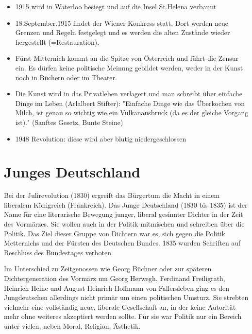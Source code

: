 \documentclass[12pt,a4paper]{article}
\begin{document}
	\begin{itemize}
	\item 1915 wird in Waterloo besiegt und auf die Insel St.Helena verbannt
	\item 18.September.1915 findet der Wiener Konkress statt. Dort werden neue Grenzen und Regeln festgelegt und es werden die alten Zustände
	wieder hergestellt (=Restauration).
	\item Fürst Mitternich kommt an die Spitze von Österreich und führt die Zensur ein. Es dürfen keine politische Meinung gebildet werden, weder in der
	Kunst noch in Büchern oder im Theater.
	\item Die Kunst wird in das Privatleben verlagert und man schreibt über einfache Dinge im Leben (Arlalbert Stifter): "Einfache Dinge wie das Überkochen 
	von Milch, ist genau so wichtig wie ein Vulkanausbruck (da es der gleiche Vorgang ist)." (Sanftes Gesetz, Bunte Steine)

	\item 1948 Revolution: diese wird aber blutig niedergeschlossen	
	
	\end{itemize}
	
\newpage	
	
\section{Junges Deutschland}

Bei der Julirevolution (1830) ergreift das Bürgertum die Macht in einem liberalem Königreich (Frankreich).
Das Junge Deutschland (1830 bis 1835) ist der Name für eine literarische Bewegung junger, liberal gesinnter Dichter in der Zeit des Vormärzes. Sie wollen auch in der Politik mitmischen und schreiben über die Politik. Das Ziel dieser Gruppe von Dichtern war es, sich gegen die Politik Metternichs und der Fürsten des Deutschen Bundes. 1835 wurden Schriften auf Beschluss des Bundestages verboten.

Im Unterschied zu Zeitgenossen wie Georg Büchner oder zur späteren Dichtergeneration des Vormärz um Georg Herwegh, Ferdinand Freiligrath, Heinrich Heine und August Heinrich Hoffmann von Fallersleben ging es den Jungdeutschen allerdings nicht primär um einen politischen Umsturz. Sie strebten vielmehr eine vollständig neue, liberale Gesellschaft an, in der keine Autorität mehr ohne weiteres akzeptiert werden sollte. Für sie war Politik nur ein Bereich unter vielen, neben Moral, Religion, Ästhetik.

\newpage
\end{document}
